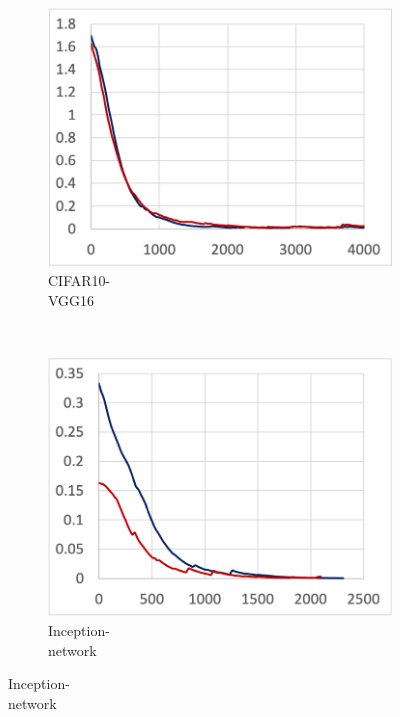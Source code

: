 \begin{figure}[!ht]
\begin{subfigure}[t]{.22\textwidth}
    \includegraphics[width=\textwidth]{tf2-06}
    \caption{\footnotesize CIFAR10-\\VGG16}
  \end{subfigure}
  ~
  \begin{subfigure}[t]{.22\textwidth}
    \includegraphics[width=\textwidth]{tf2-07}
    \caption{\footnotesize Inception-\\network}
  \end{subfigure}
  

  \par\bigskip


\end{figure}
